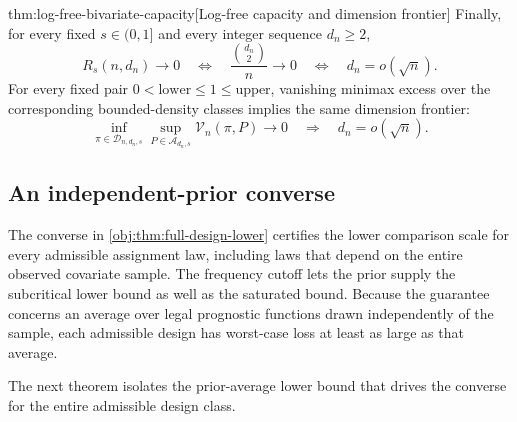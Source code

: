 \begin{theoremv}{thm:log-free-bivariate-capacity}[Log-free capacity and dimension frontier]
Finally, for every fixed \(s\in(0,1]\) and every integer sequence \(d_n\geq2\),
\[
R_s(n,d_n)\longrightarrow0
\quad\Longleftrightarrow\quad
\frac{\binom{d_n}{2}}n\longrightarrow0
\quad\Longleftrightarrow\quad
d_n=o(\sqrt n).
\]
For every fixed pair \(0<\mathrm{lower}\leq1\leq\mathrm{upper}\), vanishing minimax excess over the corresponding bounded-density classes implies the same dimension frontier:
\[
\inf_{\pi\in\mathcal D_{n,d_n,s}}
 \sup_{P\in\mathcal A_{d_n,s}}\mathcal V_n(\pi,P)
\longrightarrow0
\quad\Longrightarrow\quad
d_n=o(\sqrt n).
\]
\end{theoremv}

\subsection{An independent-prior converse}

The converse in \cref{obj:thm:full-design-lower} certifies the lower comparison scale  for every admissible assignment law, including laws that depend on the entire observed covariate sample. The frequency cutoff lets the prior supply the subcritical lower bound as well as the saturated bound. Because the guarantee concerns an average over legal prognostic functions drawn independently of the sample, each admissible design has worst-case loss at least as large as that average.

The next theorem isolates the prior-average lower bound that drives the converse for the entire admissible design class.

